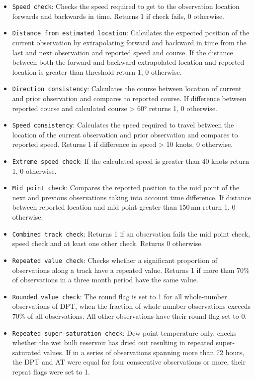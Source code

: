 \begin{itemize}[resume]
\item \texttt{Speed check}: Checks the speed required to get to the observation location forwards and backwards in time. Returns 1 if check fails, 0 otherwise.
\item \texttt{Distance from estimated location}: Calculates the expected position of the current observation by extrapolating forward and backward in time from the last and next observation and reported speed and course. If the distance between both the forward and backward extrapolated location and reported location is greater than threshold return 1, 0 otherwise.
\item \texttt{Direction consistency}: Calculates the course between location of current and prior observation and compares to reported course. If difference between reported course and calculated course > 60° returns 1, 0 otherwise.
\item \texttt{Speed consistency}: Calculates the speed required to travel between the location of the current observation and prior observation and compares to reported speed. Returns 1 if difference in speed > 10 knots, 0 otherwise.
\item \texttt{Extreme speed check}: If the calculated speed is greater than 40 knots return 1, 0 otherwise.
\item \texttt{Mid point check}: Compares the reported position to the mid point of the next and previous observations taking into account time difference. If distance between reported location and mid point greater than 150\,nm return 1, 0 otherwise.
\item \texttt{Combined track check}: Returns 1 if an observation fails the mid point check, speed check and at least one other check. Returns 0 otherwise.
\item \texttt{Repeated value check}: Checks whether a significant proportion of observations along a track have a repeated value. Returns 1 if more than 70\% of observations in a three month period have the same value.
\item \texttt{Rounded value check}: The round flag is set to 1 for all whole-number observations of DPT, when the fraction of whole-number observations exceeds 70\% of all observations. All other observations have their round flag set to 0.
\item \texttt{Repeated super-saturation check}: Dew point temperature only, checks whether the wet bulb reservoir has dried out resulting in repeated super-saturated values. If in a series of observations spanning more than 72 hours, the DPT and AT were equal for four consecutive observations or more, their repsat flags were set to 1.

\end{itemize}
